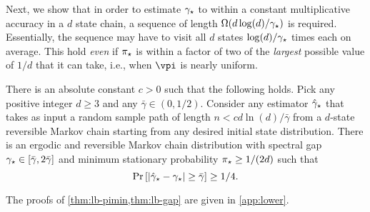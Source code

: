 Next, we show that in order to estimate
$\gamma_{\star}$ to within a constant multiplicative accuracy in a $d$ state chain,
a sequence of length $\Omega(d\log(d)/\gamma_{\star})$ is required.
Essentially, the sequence may have to visit all $d$ states $\log(d)/\gamma_{\star}$ times each on average.
This hold \emph{even} if $\pi_{\star}$ is within a factor of two of the
\emph{largest} possible value of $1/d$ that it can take, i.e., when
$\vpi$ is nearly uniform.
\begin{theorem}
  \label{thm:lb-gap}
  There is an absolute constant $c>0$ such that the following holds.
  Pick any positive integer $d \geq 3$ and any $\bar\gamma \in
  (0,1/2)$.
  Consider any estimator $\hat\gamma_{\star}$ that takes as input a random sample
  path of length $n < c d\ln(d) / \bar\gamma$ from a $d$-state
  reversible Markov chain starting from any desired initial state
  distribution.
  There is an ergodic and reversible Markov chain distribution
  with spectral gap $\gamma_{\star} \in [\bar\gamma,2\bar\gamma]$ and minimum
  stationary probability $\pi_{\star} \geq 1/(2d)$ such that
  \[
    \Pr\left[ |\hat\gamma_{\star} - \gamma_{\star}| \geq \bar\gamma\right] \geq 1/4 .
  \]
\end{theorem}

The proofs of \cref{thm:lb-pimin,thm:lb-gap} are given in
\cref{app:lower}.

